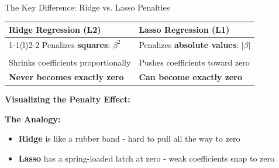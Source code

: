 \documentclass[10pt]{beamer}
\newcommand{\highlight}[1]{\textcolor{AccentOrange}{\textbf{#1}}}
\begin{document}

\begin{frame}{The Key Difference: Ridge vs. Lasso Penalties}

\begin{center}
\begin{tabular}{p{} p{}}
\textbf{Ridge Regression (L2)} & \textbf{Lasso Regression (L1)} \\
\cmidrule(r){1-1}\cmidrule(l){2-2}
Penalizes \highlight{squares}: $\beta^2$ & Penalizes \highlight{absolute values}: $|\beta|$ \\
& \\
Shrinks coefficients proportionally & Pushes coefficients toward zero \\
\highlight{Never becomes exactly zero} & \highlight{Can become exactly zero} \\
\end{tabular}
\end{center}

\vspace{1em}

\textbf{Visualizing the Penalty Effect:}

\begin{center}
\end{center}

\vspace{0.5em}

\textbf{The Analogy:}
\begin{itemize}
  \item \textcolor{ThemeBlue}{\textbf{Ridge}} is like a rubber band - hard to pull all the way to zero
  \item \textcolor{AccentOrange}{\textbf{Lasso}} has a spring-loaded latch at zero - weak coefficients snap to zero
\end{itemize}

\end{frame}
\end{document}

